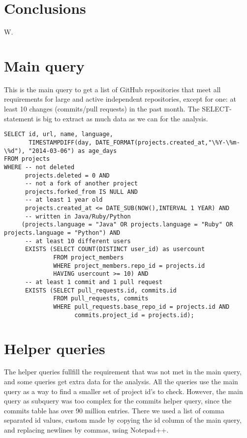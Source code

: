 \documentclass[a4paper,11pt]{article}
\begin{document}
	\section{Conclusions}
		W.

	\appendix
	\section{Main query}
	\label{app:mainquery}
	This is the main query to get a list of GitHub repositories that meet all requirements for large and active independent repositories, except for one: at least 10 changes (commits/pull requests) in the past month. The SELECT-statement is big to extract as much data as we can for the analysis.
	
	{\scriptsize
	\begin{verbatim}
SELECT id, url, name, language, 
       TIMESTAMPDIFF(day, DATE_FORMAT(projects.created_at,"\%Y-\%m-\%d"), "2014-03-06") as age_days 
FROM projects 
WHERE -- not deleted
      projects.deleted = 0 AND 
      -- not a fork of another project
      projects.forked_from IS NULL AND 
      -- at least 1 year old
      projects.created_at <= DATE_SUB(NOW(),INTERVAL 1 YEAR) AND 
      -- written in Java/Ruby/Python
     (projects.language = "Java" OR projects.language = "Ruby" OR projects.language = "Python") AND 
      -- at least 10 different users
      EXISTS (SELECT COUNT(DISTINCT user_id) as usercount 
              FROM project_members 
              WHERE project_members.repo_id = projects.id  
              HAVING usercount >= 10) AND 
      -- at least 1 commit and 1 pull request
      EXISTS (SELECT pull_requests.id, commits.id 
              FROM pull_requests, commits 
              WHERE pull_requests.base_repo_id = projects.id AND 
                    commits.project_id = projects.id);
	\end{verbatim}
	}
	
	\section{Helper queries}
	\label{app:helpquery}
	The helper queries fullfill the requirement that was not met in the main query, and some queries get extra data for the analysis. All the queries use the main query as a way to find a smaller set of project id's to check. However, the main query as subquery was too complex for the commits helper query, since the commits table has over 90 million entries. There we used a list of comma separated id values, custom made by copying the id column of the main query, and replacing newlines by commas, using Notepad++.
	
\end{document}
